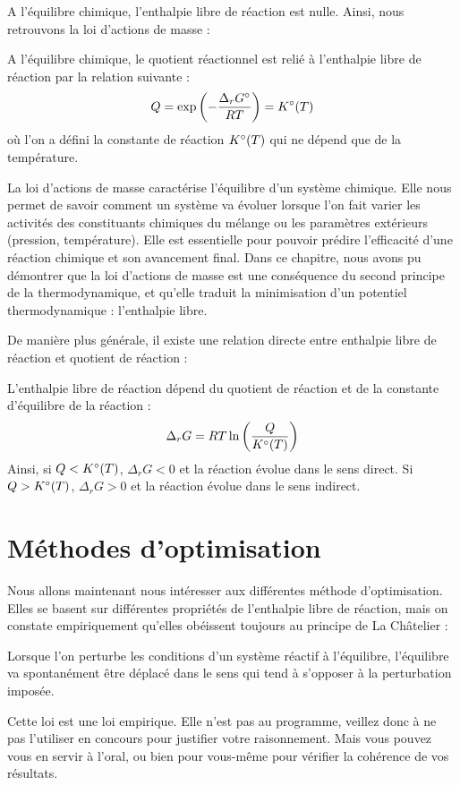 \documentclass[11pt,fleqn]{book} %
\begin{document}
A l'équilibre chimique, l'enthalpie libre de réaction est nulle. Ainsi, nous retrouvons la loi d'actions de masse :
\begin{theorem}
    A l'équilibre chimique, le quotient réactionnel est relié à l'enthalpie libre de réaction par la relation suivante :
    \begin{equation}
        Q = \exp \left( - \frac{\Delta_rG\degree}{RT} \right) = K\degree(T)
    \end{equation}
    où l'on a défini la constante de réaction $K\degree(T)$ qui ne dépend que de la température.
\end{theorem}
\begin{remark}
    La loi d'actions de masse caractérise l'équilibre d'un système chimique. Elle nous permet de savoir comment un système va évoluer lorsque l'on fait varier les activités des constituants chimiques du mélange ou les paramètres extérieurs (pression, température). Elle est essentielle pour pouvoir prédire l'efficacité d'une réaction chimique et son avancement final. Dans ce chapitre, nous avons pu démontrer que la loi d'actions de masse est une conséquence du second principe de la thermodynamique, et qu'elle traduit la minimisation d'un potentiel thermodynamique : l'enthalpie libre.
\end{remark}

De manière plus générale, il existe une relation directe entre enthalpie libre de réaction et quotient de réaction :
\begin{proposition}
    L'enthalpie libre de réaction dépend du quotient de réaction et de la constante d'équilibre de la réaction :
    \begin{equation}
        \Delta_r G = R T \ln \left( \frac{Q}{K\degree(T)} \right)
    \end{equation}
    Ainsi, si $Q < K\degree(T)$, $\Delta_rG<0$ et la réaction évolue dans le sens direct. Si $Q > K\degree(T)$, $\Delta_rG>0$ et la réaction évolue dans le sens indirect. 
\end{proposition}

\section{Méthodes d'optimisation}

Nous allons maintenant nous intéresser aux différentes méthode d'optimisation. Elles se basent sur différentes propriétés de l'enthalpie libre de réaction, mais on constate empiriquement qu'elles obéissent toujours au principe de La Châtelier :
\begin{theorem}
    Lorsque l'on perturbe les conditions d'un système réactif à l'équilibre, l'équilibre va spontanément être déplacé dans le sens qui tend à s'opposer à la perturbation imposée.
\end{theorem}
\begin{remark}
    Cette loi est une loi empirique. Elle n'est pas au programme, veillez donc à ne pas l'utiliser en concours pour justifier votre raisonnement. Mais vous pouvez vous en servir à l'oral, ou bien pour vous-même pour vérifier la cohérence de vos résultats.
\end{remark}
\end{document}
